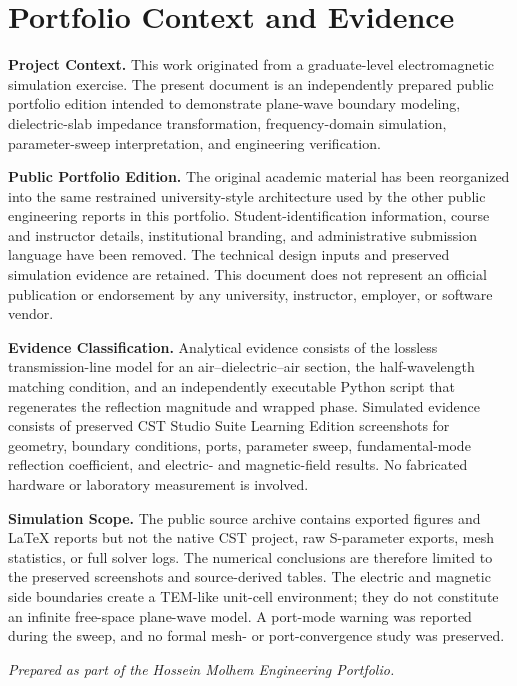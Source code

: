 \chapter*{Portfolio Context and Evidence}
\thispagestyle{fancy}

\noindent
\textbf{Project Context.}
This work originated from a graduate-level electromagnetic simulation exercise.
The present document is an independently prepared public portfolio edition intended
to demonstrate plane-wave boundary modeling, dielectric-slab impedance transformation,
frequency-domain simulation, parameter-sweep interpretation, and engineering
verification.

\vspace{0.5em}

\noindent
\textbf{Public Portfolio Edition.}
The original academic material has been reorganized into the same restrained
university-style architecture used by the other public engineering reports in this
portfolio. Student-identification information, course and instructor details,
institutional branding, and administrative submission language have been removed.
The technical design inputs and preserved simulation evidence are retained. This
document does not represent an official publication or endorsement by any university,
instructor, employer, or software vendor.

\vspace{0.5em}

\noindent
\textbf{Evidence Classification.}
Analytical evidence consists of the lossless transmission-line model for an
air--dielectric--air section, the half-wavelength matching condition, and an
independently executable Python script that regenerates the reflection magnitude and
wrapped phase. Simulated evidence consists of preserved CST Studio Suite Learning
Edition screenshots for geometry, boundary conditions, ports, parameter sweep,
fundamental-mode reflection coefficient, and electric- and magnetic-field results.
No fabricated hardware or laboratory measurement is involved.

\vspace{0.5em}

\noindent
\textbf{Simulation Scope.}
The public source archive contains exported figures and LaTeX reports but not the
native CST project, raw S-parameter exports, mesh statistics, or full solver logs.
The numerical conclusions are therefore limited to the preserved screenshots and
source-derived tables. The electric and magnetic side boundaries create a
TEM-like unit-cell environment; they do not constitute an infinite free-space
plane-wave model. A port-mode warning was reported during the sweep, and no formal
mesh- or port-convergence study was preserved.

\vfill

\begin{center}
    \textit{Prepared as part of the Hossein Molhem Engineering Portfolio.}
\end{center}
